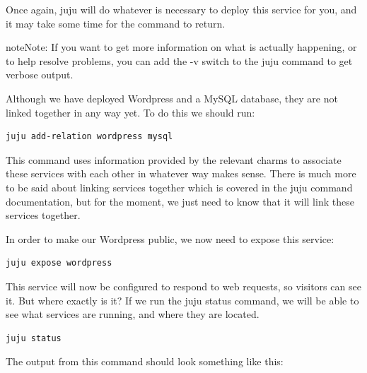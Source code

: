 \documentclass[letterpaper,10pt,english]{sphinxmanual}
\begin{document}
Once again, juju will do whatever is necessary to deploy this service
for you, and it may take some time for the command to return.

\begin{notice}{note}{Note:}
If you want to get more information on what is actually
happening, or to help resolve problems, you can add the -v switch to
the juju command to get verbose output.
\end{notice}

Although we have deployed Wordpress and a MySQL database, they are not
linked together in any way yet. To do this we should run:

\begin{Verbatim}[commandchars=\\\{\}]
juju add-relation wordpress mysql
\end{Verbatim}

This command uses information provided by the relevant charms to
associate these services with each other in whatever way makes sense.
There is much more to be said about linking services together which is
covered in the juju command documentation, but for the moment, we just
need to know that it will link these services together.

In order to make our Wordpress public, we now need to expose this
service:

\begin{Verbatim}[commandchars=\\\{\}]
juju expose wordpress
\end{Verbatim}

This service will now be configured to respond to web requests, so
visitors can see it. But where exactly is it? If we run the juju
status command, we will be able to see what services are running, and
where they are located.

\begin{Verbatim}[commandchars=\\\{\}]
juju status
\end{Verbatim}

The output from this command should look something like this:
\end{document}
